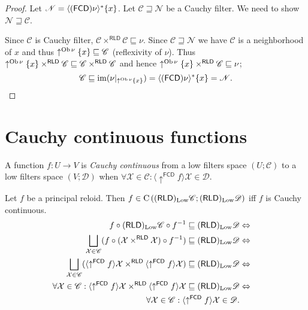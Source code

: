 \begin{proof}
  Let $\mathscr{N} = \langle (\mathsf{FCD}) \nu \rangle^{\ast} \{ x
  \}$. Let $\mathscr{C \sqsupseteq N}$ be a Cauchy filter. We need to show
  $\mathscr{N \sqsupseteq C}$.
  
  Since $\mathscr{C}$ is Cauchy filter, $\mathscr{C}
  \times^{\mathsf{RLD}} \mathscr{C} \sqsubseteq \nu$. Since $\mathscr{C
  \sqsupseteq N}$ we have $\mathscr{C}$ is a neighborhood of $x$ and thus
  $\uparrow^{\operatorname{Ob} \nu} \{ x \} \sqsubseteq \mathscr{C}$ (reflexivity of
  $\nu$). Thus $\uparrow^{\operatorname{Ob} \nu} \{ x \} \times^{\mathsf{RLD}}
  \mathscr{C} \sqsubseteq \mathscr{C} \times^{\mathsf{RLD}}
  \mathscr{C}$ and hence $\uparrow^{\operatorname{Ob} \nu} \{ x \}
  \times^{\mathsf{RLD}} \mathscr{C} \sqsubseteq \nu$;
  \[ \mathscr{C} \sqsubseteq \operatorname{im} (\nu |_{\uparrow^{\operatorname{Ob} \nu} \{ x
     \}}) = \langle (\mathsf{FCD}) \nu \rangle^{\ast} \{ x \} =
     \mathscr{N} . \]
\end{proof}

\section{Cauchy continuous functions}

\begin{defn}
  A function $f : U \rightarrow V$ is \emph{Cauchy continuous} from a low
  filters space $\left( U ; \mathscr{C} \right)$ to a low filters space
  $\left( V ; \mathscr{D} \right)$ when $\forall \mathcal{X} \in \mathscr{C} :
  \langle \uparrow^{\mathsf{FCD}} f \rangle \mathcal{X} \in
  \mathscr{D}$.
\end{defn}

\begin{prop}
  Let $f$ be a principal reloid. Then $f \in \mathrm{C} \left( 
  (\mathsf{RLD})_{\operatorname{Low}} \mathscr{C} ;
  (\mathsf{RLD})_{\operatorname{Low}} \mathscr{D} \right)$ iff $f$ is Cauchy
  continuous.
  \begin{eqnarray*}
    f \circ (\mathsf{RLD})_{\Low} \mathscr{C} \circ f^{- 1}
    \sqsubseteq (\mathsf{RLD})_{\Low} \mathscr{D} &
    \Leftrightarrow & \\
    \bigsqcup_{\mathcal{X} \in
    \mathscr{C}} (f \circ (\mathcal{X} \times^{\mathsf{RLD}}
    \mathcal{X} ) \circ f^{- 1} ) \sqsubseteq (\mathsf{RLD})_{\Low}
    \mathscr{D} & \Leftrightarrow & \\
    \bigsqcup_{\mathcal{X} \in \mathscr{C}} ( \langle \uparrow^{\mathsf{FCD}} f \rangle
    \mathcal{X} \times^{\mathsf{RLD}} \langle
    \uparrow^{\mathsf{FCD}} f \rangle \mathcal{X}) \sqsubseteq
    (\mathsf{RLD})_{\Low} \mathscr{D} & \Leftrightarrow & \\
    \forall \mathcal{X} \in \mathscr{C} : \langle
    \uparrow^{\mathsf{FCD}} f \rangle \mathcal{X}
    \times^{\mathsf{RLD}} \langle \uparrow^{\mathsf{FCD}} f
    \rangle \mathcal{X} \sqsubseteq (\mathsf{RLD})_{\Low}
    \mathscr{D} & \Leftrightarrow & \\
    \forall \mathcal{X} \in \mathscr{C} : \langle
    \uparrow^{\mathsf{FCD}} f \rangle \mathcal{X} \in \mathscr{D} . & 
    & 
  \end{eqnarray*}
\end{prop}

